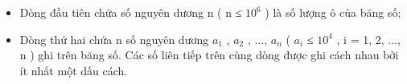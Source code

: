\begin{itemize}
	\item Dòng đầu tiên chứa số nguyên dương n ( n ≤ $10^{6}$ ) là số lượng ô của băng số;
	\item Dòng thứ hai chứa n số nguyên dương $a_{1}$ , $a_{2}$ , ..., $a_{n}$ ( $a_{i}$ ≤ $10^{4}$ , i = 1, 2, ..., n ) ghi trên băng số. Các số liên tiếp trên cùng dòng được ghi cách nhau bởi ít nhất một dấu cách.
\end{itemize}